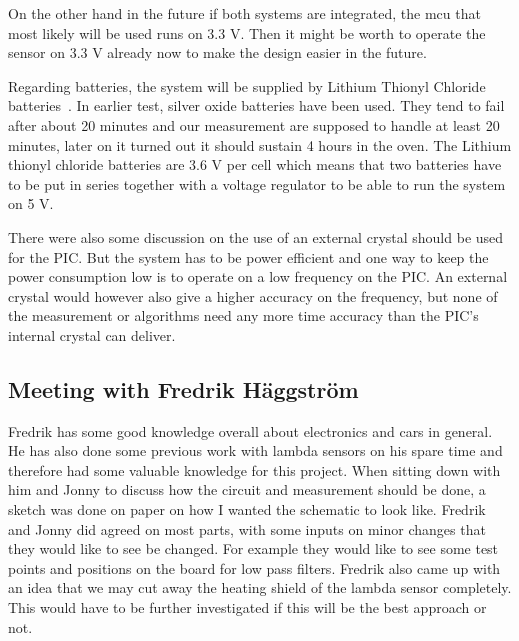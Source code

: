 On the other hand in the future if both systems are integrated, the \ac{mcu} that most likely will be used runs on 3.3 V. Then it might be worth to operate the sensor on 3.3 V already now to make the design easier in the future.


Regarding batteries, the system will be supplied by Lithium Thionyl Chloride batteries~\cite{TLH-2450}. In earlier test, silver oxide batteries have been used. They tend to fail after about 20 minutes and our measurement are supposed to handle at least 20 minutes, later on it turned out it should sustain 4 hours in the oven. The Lithium thionyl chloride batteries are 3.6 V per cell which means that two batteries have to be put in series together with a voltage regulator to be able to run the system on 5 V.

There were also some discussion on the use of an external crystal should be used for the PIC. But the system has to be power efficient and one way to keep the power consumption low is to operate on a low frequency on the PIC. An external crystal would however also give a higher accuracy on the frequency, but none of the measurement or algorithms need any more time accuracy than the PIC's internal crystal can deliver.


\subsection{Meeting with Fredrik H\"{a}ggstr\"{o}m}

Fredrik has some good knowledge overall about electronics and cars in general. He has also done some previous work with lambda sensors on his spare time and therefore had some valuable knowledge for this project. When sitting down with him and Jonny to discuss how the circuit and measurement should be done, a sketch was done on paper on how I wanted the schematic to look like. Fredrik and Jonny did agreed on most parts, with some inputs on minor changes that they would like to see be changed. For example they would like to see some test points and positions on the board for low pass filters. Fredrik also came up with an idea that we may cut away the heating shield of the lambda sensor completely. This would have to be further investigated if this will be the best approach or not.


